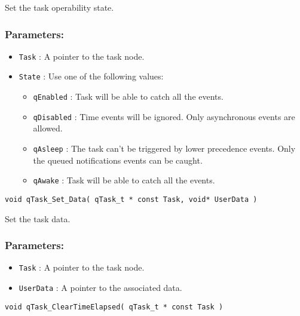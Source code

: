 Set the task operability state.   

\subsubsection*{Parameters:}
\begin{itemize}
    \item \lstinline{Task} : A pointer to the task node.
    \item \lstinline{State} : Use one of the following values:
    \begin{itemize}
        \item \lstinline{qEnabled} : Task will be able to catch all the events.
        \item \lstinline{qDisabled} : Time events will be ignored. Only asynchronous events are allowed.
        \item \lstinline{qAsleep} : The task can't be triggered by lower precedence events. Only the queued notifications events can be caught.
        \item \lstinline{qAwake} : Task will be able to catch all the events.
    \end{itemize}
\end{itemize}

\noindent\hrulefill


\begin{lstlisting}[style=CStyle]
void qTask_Set_Data( qTask_t * const Task, void* UserData )
\end{lstlisting}

Set the task data. 

\subsubsection*{Parameters:}
\begin{itemize}
    \item \lstinline{Task} : A pointer to the task node.
    \item \lstinline{UserData} : A pointer to the associated data.
\end{itemize}

\noindent\hrulefill


\begin{lstlisting}[style=CStyle]
void qTask_ClearTimeElapsed( qTask_t * const Task )
\end{lstlisting}

